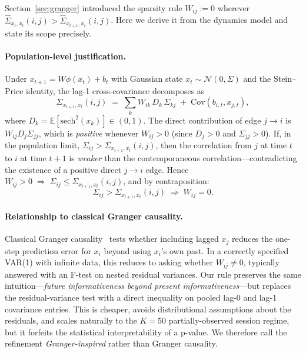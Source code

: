 \documentclass{article}
\begin{document}
Section~\ref{sec:granger} introduced the sparsity rule $W_{ij} := 0$ wherever $\hat{\Sigma}_{x_t,x_t}(i,j) > \hat{\Sigma}_{x_{t+1},x_t}(i,j)$.
Here we derive it from the dynamics model and state its scope precisely.

\paragraph{Population-level justification.}
Under $x_{t+1} = W\phi(x_t) + b_t$ with Gaussian state $x_t \sim \mathcal{N}(0,\Sigma)$ and the Stein--Price identity, the lag-1 cross-covariance decomposes as
\begin{equation}
    \Sigma_{x_{t+1},x_t}(i,j) \;=\; \sum_{k} W_{ik} \, D_k \, \Sigma_{kj} \;+\; \mathrm{Cov}(b_{i,t}, x_{j,t}),
    \label{eq:lag1_expansion}
\end{equation}
where $D_k = \mathbb{E}[\mathrm{sech}^2(x_k)] \in (0,1)$.
The direct contribution of edge $j \to i$ is $W_{ij} D_j \Sigma_{jj}$, which is \emph{positive} whenever $W_{ij} > 0$ (since $D_j > 0$ and $\Sigma_{jj} > 0$).
If, in the population limit, $\Sigma_{ij} > \Sigma_{x_{t+1},x_t}(i,j)$, then the correlation from $j$ at time $t$ to $i$ at time $t{+}1$ is \emph{weaker} than the contemporaneous correlation---contradicting the existence of a positive direct $j \to i$ edge.
Hence $W_{ij} > 0 \;\Rightarrow\; \Sigma_{ij} \leq \Sigma_{x_{t+1},x_t}(i,j)$, and by contraposition:
\[
    \Sigma_{ij} > \Sigma_{x_{t+1},x_t}(i,j) \;\Rightarrow\; W_{ij} = 0.
\]

\paragraph{Relationship to classical Granger causality.}
Classical Granger causality~\citep{granger1969investigating} tests whether including lagged $x_j$ reduces the one-step prediction error for $x_i$ beyond using $x_i$'s own past.
In a correctly specified VAR(1) with infinite data, this reduces to asking whether $W_{ij} \neq 0$, typically answered with an F-test on nested residual variances.
Our rule preserves the same intuition---\emph{future informativeness beyond present informativeness}---but replaces the residual-variance test with a direct inequality on pooled lag-0 and lag-1 covariance entries.
This is cheaper, avoids distributional assumptions about the residuals, and scales naturally to the $K=50$ partially-observed session regime, but it forfeits the statistical interpretability of a p-value.
We therefore call the refinement \emph{Granger-inspired} rather than Granger causality.
\end{document}

